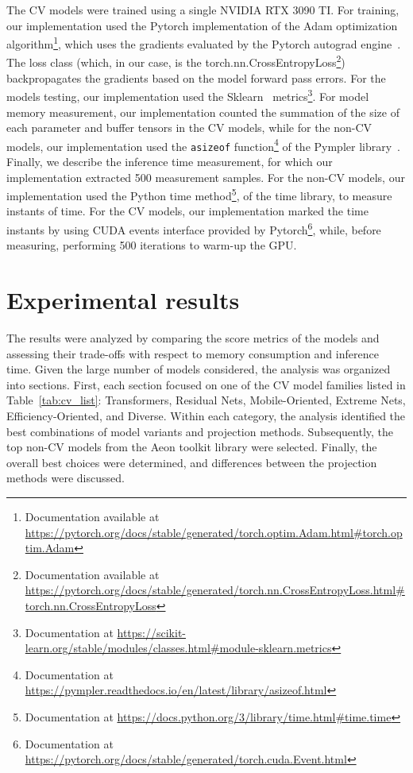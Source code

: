 The \gls{CV} models were trained using a single NVIDIA RTX 3090 TI. For training, our implementation used the Pytorch implementation of the Adam optimization algorithm\footnote{Documentation available at \url{https://pytorch.org/docs/stable/generated/torch.optim.Adam.html\#torch.optim.Adam}}, which uses the gradients evaluated by the Pytorch autograd engine~\cite{Pytorch}. The loss class (which, in our case, is the torch.nn.CrossEntropyLoss\footnote{Documentation available at \url{https://pytorch.org/docs/stable/generated/torch.nn.CrossEntropyLoss.html\#torch.nn.CrossEntropyLoss}}) backpropagates the gradients based on the model forward pass errors. For the models testing, our implementation used the Sklearn~\cite{Sklearn} metrics\footnote{Documentation at \url{https://scikit-learn.org/stable/modules/classes.html\#module-sklearn.metrics}}. For model memory measurement, our implementation counted the summation of the size of each parameter and buffer tensors in the \gls{CV} models, while for the non-\gls{CV} models, our implementation used the \texttt{asizeof} function\footnote{Documentation at \url{https://pympler.readthedocs.io/en/latest/library/asizeof.html}} of the Pympler library~\cite{Pympler}. Finally, we describe the inference time measurement, for which our implementation extracted 500 measurement samples. For the non-\gls{CV} models, our implementation used the Python time method\footnote{Documentation at \url{https://docs.python.org/3/library/time.html\#time.time}}, of the time library, to measure instants of time. For the \gls{CV} models, our implementation marked the time instants by using CUDA events interface provided by Pytorch\footnote{Documentation at \url{https://pytorch.org/docs/stable/generated/torch.cuda.Event.html}}, while, before measuring, performing 500 iterations to warm-up the GPU. 

\section{Experimental results}

The results were analyzed by comparing the score metrics of the models and assessing their trade-offs with respect to memory consumption and inference time. Given the large number of models considered, the analysis was organized into sections. First, each section focused on one of the \gls{CV} model families listed in Table~\ref{tab:cv_list}: Transformers, Residual Nets, Mobile-Oriented, Extreme Nets, Efficiency-Oriented, and Diverse. Within each category, the analysis identified the best combinations of model variants and projection methods. Subsequently, the top non-\gls{CV} models from the Aeon toolkit library were selected. Finally, the overall best choices were determined, and differences between the projection methods were discussed.


